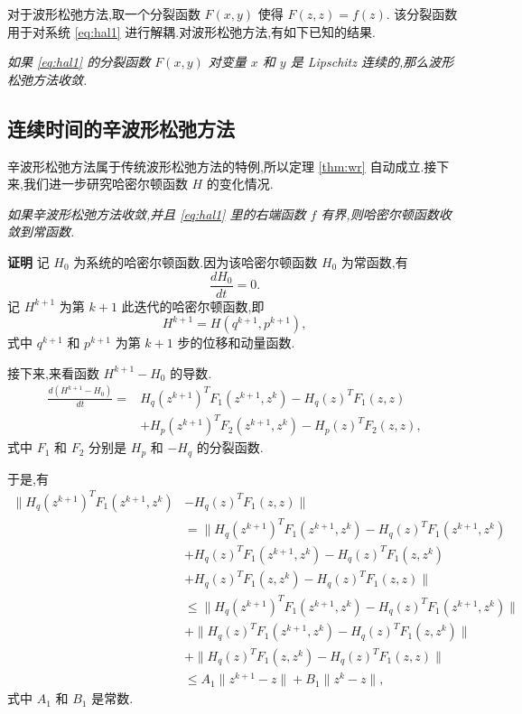 对于波形松弛方法,取一个分裂函数 $F(x,y)$ 使得 $F(z,z)=f(z)$. 该分裂函数用于对系统 \eqref{eq:hal1} 进行解耦.对波形松弛方法,有如下已知的结果.

\begin{theorem}\label{thm:wr}
	\emph{如果 \eqref{eq:hal1} 的分裂函数 $F(x,y)$ 对变量 $x$ 和 $y$ 是 Lipschitz 连续的,那么波形松弛方法收敛.}
\end{theorem}

\subsection{连续时间的辛波形松弛方法}
辛波形松弛方法属于传统波形松弛方法的特例,所以定理 \ref{thm:wr} 自动成立.接下来,我们进一步研究哈密尔顿函数 $H$ 的变化情况.

\begin{theorem}
\emph{如果辛波形松弛方法收敛,并且 \eqref{eq:hal1} 里的右端函数 $f$ 有界,则哈密尔顿函数收敛到常函数.}
\end{theorem}

{\textbf{证明}} 记 $H_0$ 为系统的哈密尔顿函数.因为该哈密尔顿函数 $H_0$ 为常函数,有
\begin{equation*}
\frac{dH_0}{dt}=0.
\end{equation*}
记 $H^{k+1}$ 为第 $k+1$ 此迭代的哈密尔顿函数,即
\begin{equation*}
H^{k+1}=H(q^{k+1},p^{k+1}),
\end{equation*}
式中 $q^{k+1}$ 和 $p^{k+1}$ 为第 $k+1$ 步的位移和动量函数.

接下来,来看函数 $H^{k+1}-H_0$ 的导数.
\begin{equation*}
\begin{aligned}
\frac{d(H^{k+1}-H_0)}{dt}=&H_q(z^{k+1})^TF_1(z^{k+1},z^{k})-H_q(z)^TF_1(z,z)\\
&+H_p(z^{k+1})^TF_2(z^{k+1},z^{k})-H_p(z)^TF_2(z,z),
\end{aligned}
\end{equation*}
式中 $F_1$ 和 $F_2$ 分别是 $H_p$ 和 $-H_q$ 的分裂函数.

于是,有
\begin{equation*}
\begin{aligned}
\|H_q(z^{k+1})^TF_1(z^{k+1},z^{k})&-H_q(z)^TF_1(z,z)\|\\
&=\|H_q(z^{k+1})^TF_1(z^{k+1},z^{k})-H_q(z)^TF_1(z^{k+1},z^{k})\\
&+H_q(z)^TF_1(z^{k+1},z^{k})-H_q(z)^TF_1(z,z^{k})\\
&+H_q(z)^TF_1(z,z^{k})-H_q(z)^TF_1(z,z)\|\\
&\le\|H_q(z^{k+1})^TF_1(z^{k+1},z^{k})-H_q(z)^TF_1(z^{k+1},z^{k})\|\\
&+\|H_q(z)^TF_1(z^{k+1},z^{k})-H_q(z)^TF_1(z,z^{k})\|\\
&+\|H_q(z)^TF_1(z,z^{k})-H_q(z)^TF_1(z,z)\|\\
&\le A_1\|z^{k+1}-z\|+B_1\|z^{k}-z\|,
\end{aligned}
\end{equation*}
式中 $A_1$ 和 $B_1$ 是常数.


